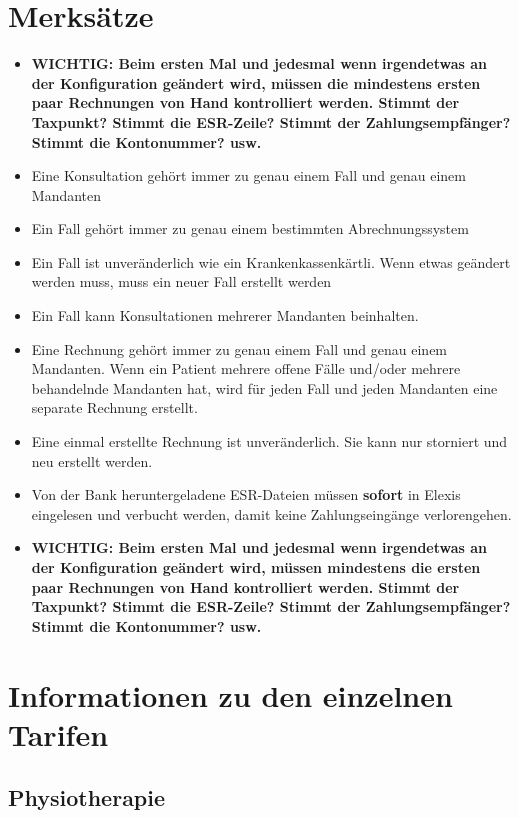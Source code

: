 \documentclass[a4paper]{scrartcl}
\begin{document}
\section{Merksätze}
\begin{itemize}
\item \textbf{WICHTIG: Beim ersten Mal und jedesmal wenn irgendetwas an der Konfiguration geändert wird, müssen die mindestens ersten paar Rechnungen von Hand kontrolliert werden. Stimmt der Taxpunkt? Stimmt die ESR-Zeile? Stimmt der Zahlungsempfänger? Stimmt die Kontonummer? usw.}
\item Eine Konsultation gehört immer zu genau einem Fall und genau einem Mandanten
\item Ein Fall gehört immer zu genau einem bestimmten Abrechnungssystem
\item Ein Fall ist unveränderlich wie ein Krankenkassenkärtli. Wenn etwas geändert werden muss, muss ein neuer Fall erstellt werden
\item Ein Fall kann Konsultationen mehrerer Mandanten beinhalten.
\item Eine Rechnung gehört immer zu genau einem Fall und genau einem Mandanten. Wenn ein Patient mehrere offene Fälle und/oder mehrere behandelnde Mandanten hat, wird für jeden Fall und jeden Mandanten eine separate Rechnung erstellt.
\item Eine einmal erstellte Rechnung ist unveränderlich. Sie kann nur storniert und neu erstellt werden.
\item Von der Bank heruntergeladene ESR-Dateien müssen \textbf{sofort} in Elexis eingelesen und verbucht werden, damit keine Zahlungseingänge verlorengehen.
\item \textbf{WICHTIG: Beim ersten Mal und jedesmal wenn irgendetwas an der Konfiguration geändert wird, müssen mindestens die ersten paar Rechnungen von Hand kontrolliert werden. Stimmt der Taxpunkt? Stimmt die ESR-Zeile? Stimmt der Zahlungsempfänger? Stimmt die Kontonummer? usw.}

\end{itemize}

\section{Informationen zu den einzelnen Tarifen}
\subsection{Physiotherapie}
\label{physiotarif}
\end{document}
